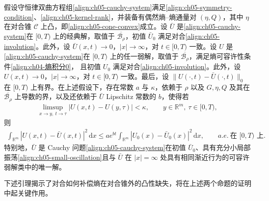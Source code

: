 \documentclass[../../main.tex]{subfiles}
\begin{document}
\begin{theorem}\label{theorem:ch05-involution-stability}
假设守恒律双曲方程组\eqref{align:ch05-cauchy-system}满足\eqref{align:ch05-symmetry-condition}、\eqref{align:ch05-kernel-rank}，并装备有偶然熵--熵通量对 $(\eta,Q)$，其中 $\eta$ 在对合锥 $\mathscr{C}$ 上凸，即\eqref{align:ch05-cone-convex}成立。设 $\bar{U}$ 是\eqref{align:ch05-cauchy-system}在 $[0,T)$ 上的经典解，取值于 $\overline{\mathscr{B}_{\rho}}$，初值 $\bar{U}_{0}$ 满足对合\eqref{align:ch05-involution}。此外，设 $\bar{U}(x,t)\to0$，$|x|\to\infty$，对 $t\in[0,T)$ 一致。设 $U$ 是\eqref{align:ch05-cauchy-system}在 $[0,T)$ 上的任一弱解，取值于 $\overline{\mathscr{B}_{\rho}}$，满足熵可容许性条件\eqref{align:ch04-熵积分0}，
且初值 $U_{0}$ 满足对合\eqref{align:ch05-involution}。此外，设 $U(x,t)\to0$，$|x|\to\infty$，对 $t\in[0,T)$ 一致。最后，设 $\|U(\cdot,t)-\bar{U}(\cdot,t)\|_{0}$ 在 $[0,T)$ 上有界。在上述假设下，存在常数 $a$ 与 $\kappa$，依赖于 $\rho$ 以及 $G,\eta,Q$ 及其在 $\overline{\mathscr{B}_{\rho}}$ 上导数的界，以及还依赖于 $\bar{U}$ Lipschitz 常数的 $b$，使得若
\begin{align}
\limsup_{x\to y,\ t\to\tau}|U(x,t)-U(y,\tau)|<\kappa,\qquad y\in\mathbb{R}^{m},\ \tau\in[0,T),\label{align:ch05-small-oscillation}
\end{align}
则
\begin{align}
\int_{\mathbb{R}^{m}}|U(x,t)-\bar{U}(x,t)|^{2}\,\mathrm{d}x\leqslant ae^{bt}\int_{\mathbb{R}^{m}}|U_{0}(x)-\bar{U}_{0}(x)|^{2}\,\mathrm{d}x,\qquad a.e.\ \text{在 }[0,T)\text{ 上}.\label{align:ch05-involution-stability-est}
\end{align}
特别地，$\bar{U}$ 是 Cauchy 问题\eqref{align:ch05-cauchy-system}在初值 $\bar{U}_{0}$、具有充分小局部振荡\eqref{align:ch05-small-oscillation}且与 $\bar{U}$ 在 $|x|=\infty$ 处具有相同渐近行为的可容许弱解类中的唯一解。
\end{theorem}

下述引理揭示了对合如何补偿熵在对合锥外的凸性缺失，将在上述两个命题的证明中起关键作用。
\end{document}
